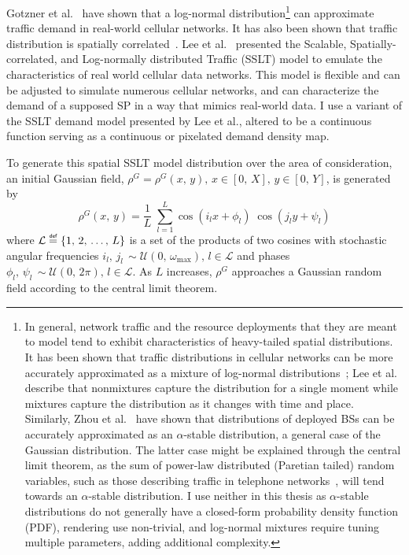\documentclass[12pt,dvipsnames]{report}
\newcommand\defeq{\mathrel{\overset{\makebox[0pt]{\mbox{\normalfont\tiny\sffamily def}}}{=}}}
\begin{document}
Gotzner et al.~\cite{686105} have shown that a log-normal distribution\footnote{In general, network traffic and the resource deployments that they are meant to model tend to exhibit characteristics of heavy-tailed spatial distributions.  It has been shown that traffic distributions in cellular networks can be more accurately approximated as a mixture of log-normal distributions~\cite{5936263, 6757900}; Lee et al.~\cite{6757900} describe that nonmixtures capture the distribution for a single moment while mixtures capture the distribution as it changes with time and place.  Similarly, Zhou et al.~\cite{7202841} have shown that distributions of deployed BSs can be accurately approximated as an $\alpha$-stable distribution, a general case of the Gaussian distribution.  The latter case might be explained through the central limit theorem, as the sum of power-law distributed (Paretian tailed) random variables, such as those describing traffic in telephone networks~\cite{PhysRevE.72.026116}, will tend towards an $\alpha$-stable distribution.  I use neither in this thesis as $\alpha$-stable distributions do not generally have a closed-form probability density function (PDF), rendering use non-trivial, and log-normal mixtures require tuning multiple parameters, adding additional complexity.} can approximate traffic demand in real-world cellular networks.  It has also been shown that traffic distribution is spatially correlated~\cite{5936263, eigenplaces}.  Lee et al.~\cite{6554749} presented the Scalable, Spatially-correlated, and Log-normally distributed Traffic (SSLT) model to emulate the characteristics of real world cellular data networks.  This model is flexible and can be adjusted to simulate numerous cellular networks, and can characterize the demand of a supposed SP in a way that mimics real-world data.  I use a variant of the SSLT demand model presented by Lee et al., altered to be a continuous function serving as a continuous or pixelated demand density map.

To generate this spatial SSLT model distribution over the area of consideration, an initial Gaussian field, $\rho^G = \rho^G\left(x,\, y\right),\, x \in \left[0,\, X\right],\, y \in \left[0,\, Y\right]$, is generated by
\begin{equation} \label{eq:rhoG}
\rho^G\left(x,\, y\right) = \frac{1}{L} \; \sum_{l=1}^L \cos\left(i_lx+\phi_l\right) \; \cos\left(j_ly+\psi_l\right)
\end{equation}
where $\mathcal{L} \defeq \left\{1,\, 2,\, \ldots,\, L\right\}$ is a set of the products of two cosines with stochastic angular frequencies $i_l,\, j_l\, \sim \mathcal{U}\left(0,\, \omega_{\max}\right),\, l \in \mathcal{L}$ and phases $\phi_l,\, \psi_l\, \sim \mathcal{U}\left(0,\, 2\pi\right),\, l \in \mathcal{L}$.  As $L$ increases, $\rho^G$ approaches a Gaussian random field according to the central limit theorem.
\end{document}
